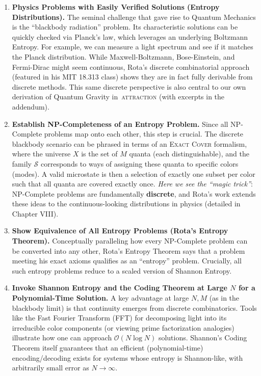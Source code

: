 \documentclass{report}
\begin{document}
\begin{enumerate}
    \item 
        \textbf{Physics Problems with Easily Verified Solutions (Entropy Distributions).} 
        The seminal challenge that gave rise to Quantum Mechanics is the ``blackbody radiation'' 
        problem. Its characteristic solutions can be quickly checked via Planck’s law, which 
        leverages an underlying Boltzmann Entropy. For example, we can measure a light spectrum and 
        see if it matches the Planck distribution. While Maxwell-Boltzmann, Bose-Einstein, and 
        Fermi-Dirac might seem continuous, Rota’s discrete combinatorial approach (featured in his 
        MIT 18.313 class) shows they are in fact fully derivable from discrete methods. This same 
        discrete perspective is also central to our own derivation of Quantum Gravity 
        in~\textsc{attraction}\cite{AbadirAttraction2024} (with excerpts in the addendum).

    \item 
        \textbf{Establish NP-Completeness of an Entropy Problem.} 
        Since all NP-Complete problems map onto each other, this step is crucial. The discrete 
        blackbody scenario can be phrased in terms of an \textsc{Exact Cover} formalism, where 
        the universe \(X\) is the set of \(M\) quanta (each distinguishable), and the family 
        \(\mathcal{S}\) corresponds to ways of assigning these quanta to specific colors (modes). 
        A valid microstate is then a selection of exactly one subset per color such that all 
        quanta are covered exactly once. \emph{Here we see the ``magic trick''}: NP-Complete 
        problems are fundamentally \textbf{discrete}, and Rota’s work extends these ideas to the 
        continuous-looking distributions in physics (detailed in Chapter VIII\cite{RotaBaclawski}).

    \item 
        \textbf{Show Equivalence of All Entropy Problems (Rota’s Entropy Theorem).} 
        Conceptually paralleling how every NP-Complete problem can be converted into any other, 
        Rota’s Entropy Theorem says that a problem meeting his exact axioms qualifies as an 
        ``entropy'' problem. Crucially, all such entropy problems reduce to a scaled version of 
        Shannon Entropy. 

    \item 
        \textbf{Invoke Shannon Entropy and the Coding Theorem at Large \(N\) for a Polynomial-Time Solution.} 
        A key advantage at large \(N, M\) (as in the blackbody limit) is that continuity emerges 
        from discrete combinatorics. Tools like the Fast Fourier Transform (FFT) for decomposing 
        light into its irreducible color components (or viewing prime factorization analogies) 
        illustrate how one can approach \(\mathcal{O}(N \log N)\) solutions. Shannon’s Coding 
        Theorem itself guarantees that an efficient (polynomial-time) encoding/decoding exists for 
        systems whose entropy is Shannon-like, with arbitrarily small error as \(N\to\infty\).


\end{enumerate}
\end{document}

